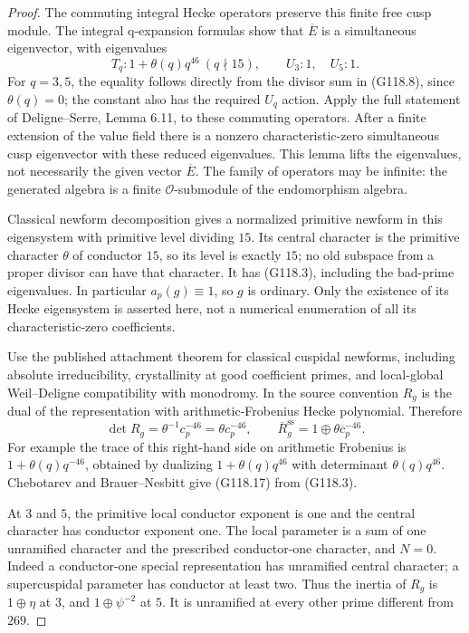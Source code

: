 \begin{proof}
The commuting integral Hecke operators preserve this finite free cusp module.
The integral q-expansion formulas show that $\overline E$ is a simultaneous
eigenvector, with eigenvalues
\[
 T_q:1+\theta(q)q^{46}\ (q\nmid15),\qquad U_3:1,\quad U_5:1.
                                                        \tag{G118.16}
\]
For $q=3,5$, the equality follows directly from the divisor sum in (G118.8),
since $\theta(q)=0$; the constant also has the required $U_q$ action.
Apply the full statement of Deligne--Serre, Lemma 6.11, to these commuting
operators.  After a finite extension of the value field there is a nonzero
characteristic-zero simultaneous cusp eigenvector with these reduced
eigenvalues.  This lemma lifts the eigenvalues, not necessarily the given
vector $\overline E$.  The family of operators may be infinite: the generated
algebra is a finite $\mathcal O$-submodule of the endomorphism algebra.

Classical newform decomposition gives a normalized primitive newform in this
eigensystem with primitive level dividing $15$.  Its central character is
the primitive character $\theta$ of conductor $15$, so its level is exactly
$15$; no old subspace from a proper divisor can have that character.
It has (G118.3), including the bad-prime eigenvalues.
In particular $a_p(g)\equiv1$, so $g$ is ordinary.
Only the existence of its Hecke eigensystem is asserted here, not a numerical
enumeration of all its characteristic-zero coefficients.

Use the published attachment theorem for classical cuspidal newforms,
including absolute irreducibility, crystallinity at good coefficient primes,
and local-global Weil--Deligne compatibility with monodromy.
In the source convention $R_g$ is the dual of the representation with
arithmetic-Frobenius Hecke polynomial.  Therefore
\[
 \det R_g=\theta^{-1}c_p^{-46}=\theta c_p^{-46},\qquad
 \overline R_g^{\mathrm{ss}}=1\oplus\theta\overline c_p^{-46}.
                                                        \tag{G118.17}
\]
For example the trace of this right-hand side on arithmetic Frobenius is
$1+\theta(q)q^{-46}$, obtained by dualizing
$1+\theta(q)q^{46}$ with determinant $\theta(q)q^{46}$.
Chebotarev and Brauer--Nesbitt give (G118.17) from (G118.3).

At $3$ and $5$, the primitive local conductor exponent is one and the central
character has conductor exponent one.  The local parameter is a sum of one
unramified character and the prescribed conductor-one character, and $N=0$.
Indeed a conductor-one special representation has unramified central character;
a supercuspidal parameter has conductor at least two.  Thus the inertia of
$R_g$ is $1\oplus\eta$ at $3$, and $1\oplus\psi^{-2}$ at $5$.
It is unramified at every other prime different from $269$.


\end{proof}
